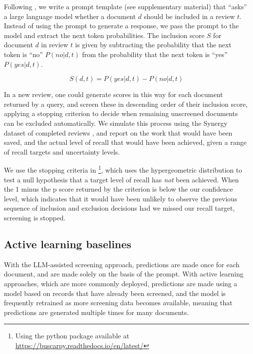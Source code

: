 \documentclass{article}
\begin{document}
	Following \cite{wang_zero-shot_2024}, we write a prompt template (see supplementary material) that ``asks'' a large language model whether a document $d$ should be included in a review $t$. Instead of using the prompt to generate a response, we pass the prompt to the model and extract the next token probabilities. The inclusion score $S$ for document $d$ in review $t$ is given by subtracting the probability that the next token is ``no'' $P(no|d,t)$ from the probability that the next token is ``yes'' $P(yes|d,t)$.
	
	\begin{equation}S(d,t) = P(yes|d,t) - P(no|d,t)\end{equation}
	
	In a new review, one could generate scores in this way for each document returned by a query, and screen these in descending order of their inclusion score, applying a stopping criterion to decide when remaining unscreened documents can be excluded automatically.  We simulate this process using the Synergy dataset of completed reviews \cite{de_bruin_synergy_2023}, and report on the work that would have been saved, and the actual level of recall that would have been achieved, given a range of recall targets and uncertainty levels.
	
	We use the stopping criteria in \cite{callaghan_statistical_2020}\footnote{Using the python package available at \url{https://buscarpy.readthedocs.io/en/latest/}}, which uses the hypergeometric distribution to test a null hypothesis that a target level of recall has \textit{not} been achieved. When the 1 minus the p score returned by the criterion is below the our confidence level, which indicates that it would have been unlikely to observe the previous sequence of inclusion and exclusion decisions had we missed our recall target, screening is stopped. 
	
	\subsection*{Active learning baselines}
	
	With the LLM-assisted screening approach, predictions are made once for each document, and are made solely on the basis of the prompt. With active learning approaches, which are more commonly deployed, predictions are made using a model based on records that have already been screened, and the model is frequently retrained as more screening data becomes available, meaning that predictions are generated multiple times for many documents.
	
\end{document}
